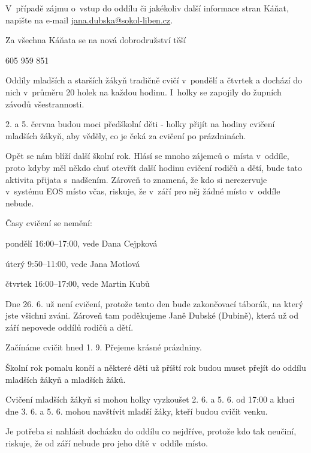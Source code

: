 \documentclass[11pt]{article}
\begin{document}
V~případě zájmu o~vstup do oddílu či jakékoliv další informace stran
Káňat, napište na e-mail
\href{mailto:jana.dubska@sokol-liben.cz}{jana.dubska@sokol-liben.cz}.

Za všechna Káňata se na nová dobrodružství těší

\signature{Jana Dubská (Dubina)}{605 959 851}

\vspace*{24pt}

Oddíly mladších a starších žákyň tradičně cvičí v~pondělí a čtvrtek a
dochází do nich v~průměru 20 holek na každou hodinu. I~holky se zapojily
do župních závodů všestrannosti.

2. a 5. června budou moci předškolní děti - holky přijít na
hodiny cvičení mladších žákyň, aby věděly, co je čeká za cvičení po
prázdninách.

\signature{Tomáš Dragoun}{}

\vspace*{24pt}

Opět se nám blíží další školní rok. Hlásí se mnoho zájemců o~místa
v~oddíle, proto kdyby měl někdo chuť otevřít další hodinu cvičení rodičů
a dětí, bude tato aktivita přijata s~nadšením. Zároveň to znamená, že
kdo si nerezervuje v~systému EOS místo včas, riskuje, že v~září pro něj
žádné místo v~oddíle nebude.

Časy cvičení se nemění:

pondělí 16:00--17:00, vede Dana Cejpková

úterý 9:50--11:00, vede Jana Motlová

čtvrtek 16:00--17:00, vede Martin Kubů

Dne 26. 6. už není cvičení, protože tento den bude
zakončovací táborák, na který jste všichni zváni. Zároveň tam
poděkujeme Janě Dubské (Dubině), která už od září nepovede oddílů rodičů
a dětí.

Začínáme cvičit hned 1. 9. Přejeme krásné prázdniny.

\signature{Jana, Dana, Jana a nově Martin}{}

\clearpage
{}
Školní rok pomalu končí a některé děti už příští rok budou muset přejít
do oddílu mladších žákyň a mladších žáků.

Cvičení mladších žákyň si mohou holky vyzkoušet 2. 6. a 5. 6. od 17:00 a
kluci dne 3. 6. a 5. 6. mohou navštívit mladší žáky, kteří budou cvičit
venku.

Je potřeba si nahlásit docházku do oddílu co nejdříve, protože kdo tak
neučiní, riskuje, že od září nebude pro jeho dítě v~oddíle místo.
\end{document}
